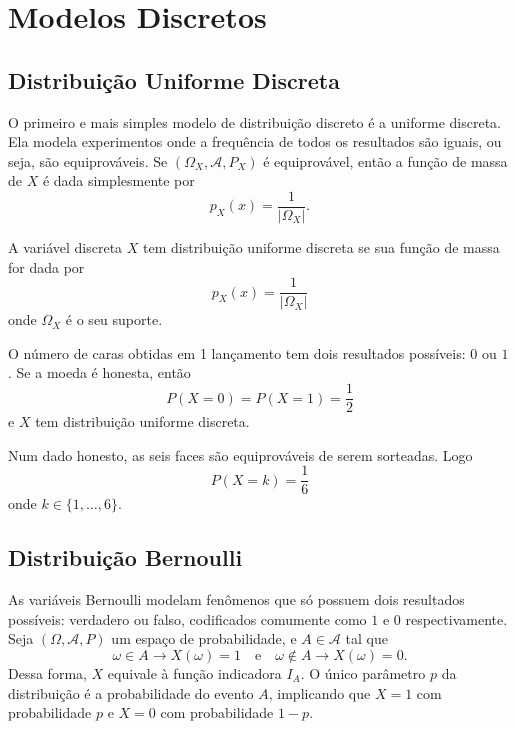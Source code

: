 \section{Modelos Discretos}

\subsection{Distribuição Uniforme Discreta}

O primeiro e mais simples modelo de distribuição discreto é a uniforme discreta.
Ela modela experimentos onde a frequência de todos os resultados são iguais, ou seja,
são equiprováveis.
Se $(\Omega_X, \mathcal{A}, P_X)$ é equiprovável, então a função de massa de $X$ é dada
simplesmente por
\[
    p_X(x) = \frac{1}{|\Omega_X|}.
\]

\begin{def:uniforme discreta}
A variável discreta $X$ tem distribuição uniforme discreta se sua função de massa for dada
por
\[
    p_X(x) = \frac{1}{|\Omega_X|}
\]
onde $\Omega_X$ é o seu suporte.
\end{def:uniforme discreta}

\begin{exp:uniforme discreta 1}
O número de caras obtidas em 1 lançamento tem dois resultados possíveis: $0$ ou $1$.
Se a moeda é honesta, então
\[
    P(X = 0) = P(X = 1) = \frac{1}{2}
\]
e $X$ tem distribuição uniforme discreta.
\end{exp:uniforme discreta 1}

\begin{exp:uniforme discreta 1}
Num dado honesto, as seis faces são equiprováveis de serem sorteadas.
Logo
\[
    P(X = k) = \frac{1}{6}
\]
onde $k \in \{1, \ldots, 6\}$.
\end{exp:uniforme discreta 1}

\subsection{Distribuição Bernoulli}

As variáveis Bernoulli modelam fenômenos que só possuem dois resultados possíveis:
verdadero ou falso, codificados comumente como $1$ e $0$ respectivamente.
Seja $(\Omega, \mathcal{A}, P)$ um espaço de probabilidade, e $A \in \mathcal{A}$ tal que
\[
    \omega \in A \rightarrow X(\omega) = 1 \quad \text{e} \quad \omega \notin A \rightarrow X(\omega)  = 0.
\]
Dessa forma, $X$ equivale à função indicadora $I_A$.
O único parâmetro $p$ da distribuição é a probabilidade do evento $A$, implicando que
$X = 1$ com probabilidade $p$ e $X = 0$ com probabilidade $1 - p$.

